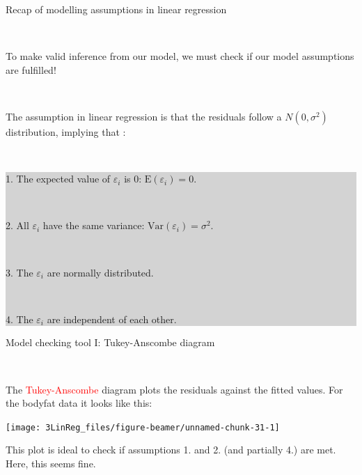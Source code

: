 \documentclass[10pt,ignorenonframetext,]{beamer}
\begin{document}
\begin{frame}

\begin{block}{Recap of modelling assumptions in linear regression}

\(~\)

To make valid inference from our model, we must check if our model
assumptions are fulfilled!

\(~\)

The assumption in linear regression is that the residuals follow a
\(N(0,\sigma^2)\) distribution, implying that :

\(~\)

\colorbox{lightgray}{\begin{minipage}{10cm}
1. The expected value of $\varepsilon_i$ is 0: $\text{E}(\varepsilon_i)=0$. 

$~$

2. All $\varepsilon_i$ have the same variance: $\text{Var}(\varepsilon_i)=\sigma^2$.  

$~$

3. The $\varepsilon_i$ are normally distributed. 

$~$

4. The $\varepsilon_i$ are independent of each other.
\end{minipage}}

\end{block}

\end{frame}

\begin{frame}

\begin{block}{Model checking tool I: Tukey-Anscombe diagram}

\(~\)

The \textcolor{red}{Tukey-Anscombe} diagram plots the residuals against
the fitted values. For the bodyfat data it looks like this:

\begin{center}\texttt{[image: 3LinReg\_files/figure-beamer/unnamed-chunk-31-1]} \end{center}

This plot is ideal to check if assumptions 1. and 2. (and partially 4.)
are met. Here, this seems fine.

\end{block}

\end{frame}
\end{document}
